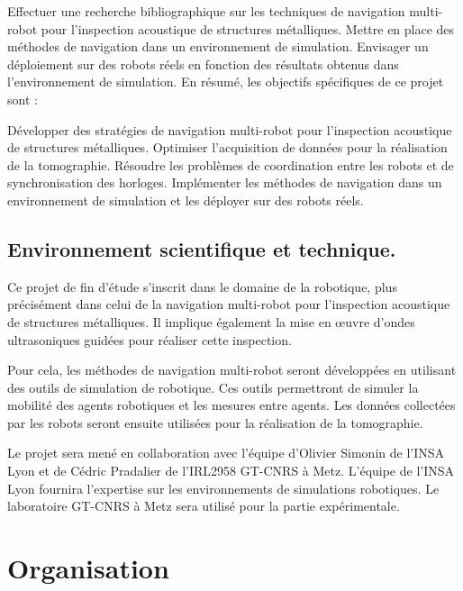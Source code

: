 \documentclass[init,francais,RandD]{rapportPFE}  %
\begin{document}
			Effectuer une recherche bibliographique sur les techniques de navigation multi-robot pour l'inspection acoustique de structures métalliques.
			Mettre en place des méthodes de navigation dans un environnement de simulation.
			Envisager un déploiement sur des robots réels en fonction des résultats obtenus dans l'environnement de simulation.
			En résumé, les objectifs spécifiques de ce projet sont :

			Développer des stratégies de navigation multi-robot pour l'inspection acoustique de structures métalliques.
			Optimiser l'acquisition de données pour la réalisation de la tomographie.
			Résoudre les problèmes de coordination entre les robots et de synchronisation des horloges.
			Implémenter les méthodes de navigation dans un environnement de simulation et les déployer sur des robots réels.
		\subsection{Environnement scientifique et technique.}
			Ce projet de fin d'étude s'inscrit dans le domaine de la robotique, plus précisément dans celui de la navigation multi-robot pour l'inspection acoustique de structures métalliques. Il implique également la mise en œuvre d'ondes ultrasoniques guidées pour réaliser cette inspection.

			Pour cela, les méthodes de navigation multi-robot seront développées en utilisant des outils de simulation de robotique. Ces outils permettront de simuler la mobilité des agents robotiques et les mesures entre agents. Les données collectées par les robots seront ensuite utilisées pour la réalisation de la tomographie.

			Le projet sera mené en collaboration avec l'équipe d'Olivier Simonin de l'INSA Lyon et de Cédric Pradalier de l'IRL2958 GT-CNRS à Metz. L'équipe de l'INSA Lyon fournira l'expertise sur les environnements de simulations robotiques. Le laboratoire GT-CNRS à Metz sera utilisé pour la partie expérimentale.
	\section{Organisation}
\end{document}
